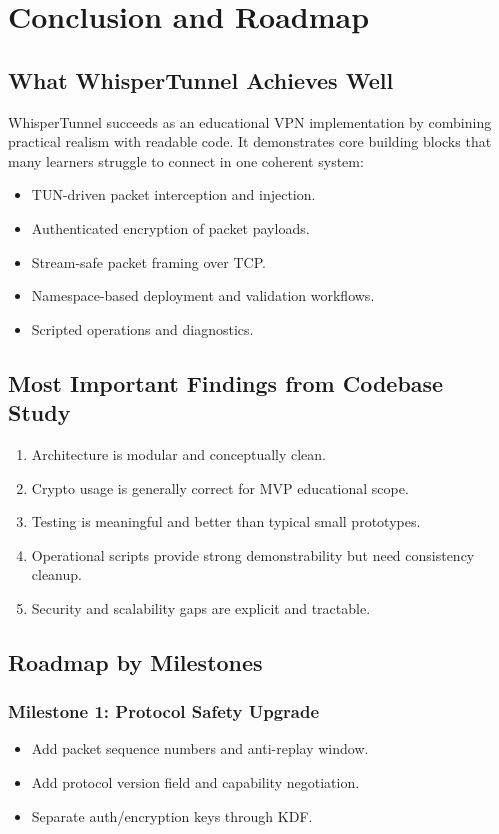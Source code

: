 \chapter{Conclusion and Roadmap}

\section{What WhisperTunnel Achieves Well}
WhisperTunnel succeeds as an educational VPN implementation by combining practical realism with readable code. It demonstrates core building blocks that many learners struggle to connect in one coherent system:
\begin{itemize}[leftmargin=2em]
\item TUN-driven packet interception and injection.
\item Authenticated encryption of packet payloads.
\item Stream-safe packet framing over TCP.
\item Namespace-based deployment and validation workflows.
\item Scripted operations and diagnostics.
\end{itemize}

\section{Most Important Findings from Codebase Study}
\begin{enumerate}[leftmargin=2em]
\item Architecture is modular and conceptually clean.
\item Crypto usage is generally correct for MVP educational scope.
\item Testing is meaningful and better than typical small prototypes.
\item Operational scripts provide strong demonstrability but need consistency cleanup.
\item Security and scalability gaps are explicit and tractable.
\end{enumerate}

\section{Roadmap by Milestones}
\subsection{Milestone 1: Protocol Safety Upgrade}
\begin{itemize}[leftmargin=2em]
\item Add packet sequence numbers and anti-replay window.
\item Add protocol version field and capability negotiation.
\item Separate auth/encryption keys through KDF.
\end{itemize}

